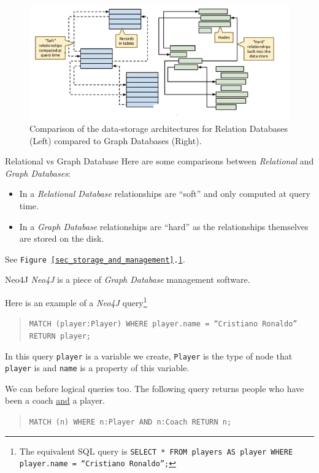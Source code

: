 \documentclass[11pt,a4paper]{article}
\begin{document}
  \begin{figure}[H]
    \centering\includegraphics[width=.7\textwidth]{GraphVsRelational.PNG}
    \caption{Comparison of the data-storage architectures for Relation Databases (Left) compared to Graph Databases (Right).}
    \label{fig_graph_vs_relational}
  \end{figure}

  \begin{proposition}{Relational vs Graph Database}
    Here are some comparisons between \textit{Relational} and \textit{Graph Databases}:
    \begin{itemize}
      \item In a \textit{Relational Database} relationships are ``soft'' and only computed at query time.
      \item In a \textit{Graph Database} relationships are ``hard'' as the relationships themselves are stored on the disk.
    \end{itemize}
    See \texttt{Figure \ref{sec_storage_and_management}.\ref{fig_graph_vs_relational}}.
  \end{proposition}

  \begin{proposition}{Neo4J}
    \textit{Neo4J} is a piece of \textit{Graph Database} management software.
    \par Here is an example of a \textit{Neo4J} query\footnote{The equivalent SQL query is \texttt{SELECT * FROM players AS player WHERE player.name = ``Cristiano Ronaldo'';} }
    \begin{quote}
      \texttt{MATCH (player:Player) WHERE player.name = ``Cristiano Ronaldo'' RETURN player;}
    \end{quote}
    In this query \texttt{player} is a variable we create, \texttt{Player} is the type of node that \texttt{player} is and \texttt{name}  is a property of this variable.
    \par We can before logical queries too. The following query returns people who have been a coach \underline{and} a player.
    \begin{quote}
      \texttt{MATCH (n) WHERE n:Player AND n:Coach RETURN n;}
    \end{quote}
  \end{proposition}
\end{document}
